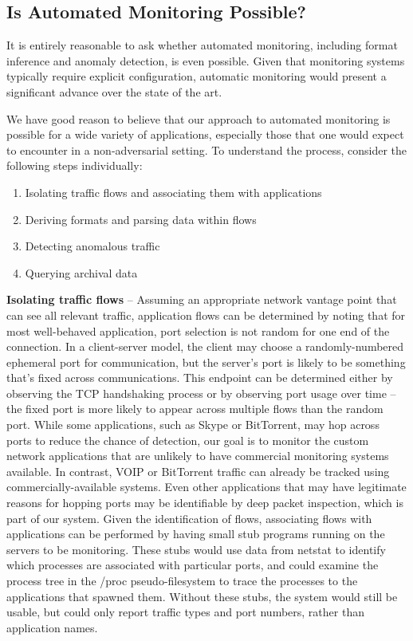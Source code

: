 
\subsection{Is Automated Monitoring Possible?}

It is entirely reasonable to ask whether automated monitoring,
including format inference and anomaly detection, is even
possible. Given that monitoring systems typically require explicit
configuration, automatic monitoring would present a significant
advance over the state of the art.

We have good reason to believe that our approach to automated
monitoring is possible for a wide variety of applications, especially
those that one would expect to encounter in a non-adversarial setting.
To understand the process, consider the following steps individually:

\begin{enumerate}
\item Isolating traffic flows and associating them with applications
\item Deriving formats and parsing data within flows
\item Detecting anomalous traffic
\item Querying archival data
\end{enumerate}

{\bf Isolating traffic flows} -- Assuming an appropriate network
vantage point that can see all relevant traffic, application flows can
be determined by noting that for most well-behaved application, port
selection is not random for one end of the connection. In a
client-server model, the client may choose a randomly-numbered
ephemeral port for communication, but the server's port is likely to
be something that's fixed across communications. This endpoint can be
determined either by observing the TCP handshaking process or by
observing port usage over time -- the fixed port is more likely to
appear across multiple flows than the random port. While some
applications, such as Skype or BitTorrent, may hop across ports to
reduce the chance of detection, our goal is to monitor the custom
network applications that are unlikely to have commercial monitoring
systems available. In contrast, VOIP or BitTorrent traffic can already
be tracked using commercially-available systems. Even other
applications that may have legitimate reasons for hopping ports may be
identifiable by deep packet inspection, which is part of our
system. Given the identification of flows, associating flows with
applications can be performed by having small stub programs running on
the servers to be monitoring. These stubs would use data from netstat
to identify which processes are associated with particular ports, and
could examine the process tree in the /proc pseudo-filesystem to trace
the processes to the applications that spawned them. Without these
stubs, the system would still be usable, but could only report traffic
types and port numbers, rather than application names.

